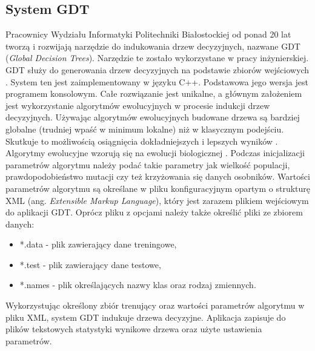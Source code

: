 \subsection{System GDT}
Pracownicy Wydziału Informatyki Politechniki Białostockiej od ponad 20 lat tworzą i rozwijają narzędzie do indukowania drzew decyzyjnych, nazwane GDT (\textit{Global Decision Trees}). Narzędzie te zostało wykorzystane w pracy inżynierskiej. GDT służy do generowania drzew decyzyjnych na podstawie zbiorów wejściowych \cite{sgdt_1}. System ten jest zaimplementowany w języku C++. Podstawowa jego wersja jest programem konsolowym. Całe rozwiązanie jest unikalne, a głównym założeniem jest wykorzystanie algorytmów ewolucyjnych w procesie indukcji drzew decyzyjnych. Używając algorytmów ewolucyjnych budowane drzewa są bardziej globalne (trudniej wpaść w minimum lokalne) niż w klasycznym podejściu. Skutkuje to możliwością osiągnięcia dokładniejszych i lepszych wyników \cite{sgdt_2}. Algorytmy ewolucyjne wzorują się na ewolucji biologicznej \cite{book_2}. Podczas inicjalizacji parametrów algorytmu należy podać takie parametry jak wielkość populacji, prawdopodobieństwo mutacji czy też krzyżowania się danych osobników. Wartości parametrów algorytmu są określane w pliku konfiguracyjnym opartym o strukturę XML (ang. \textit{Extensible Markup Language}), który jest zarazem plikiem wejściowym do aplikacji GDT. Oprócz pliku z opcjami należy także określić pliki ze zbiorem danych:
\begin{itemize}
	\item *.data - plik zawierający dane treningowe, 
	\item *.test - plik zawierający dane testowe,
	\item *.names - plik określających nazwy klas oraz rodzaj zmiennych.
\end{itemize}
Wykorzystując  określony zbiór trenujący oraz wartości parametrów algorytmu w pliku XML, system GDT indukuje drzewa decyzyjne. Aplikacja zapisuje do plików tekstowych statystyki wynikowe drzewa oraz użyte ustawienia parametrów.


